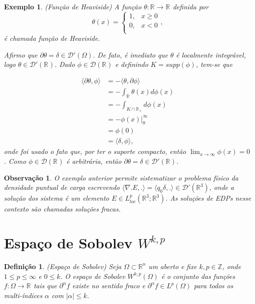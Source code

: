 \documentclass[12pt]{book}
\newtheorem{definicao}[teorema]{Definição}
\newtheorem{exemplo}[teorema]{Exemplo}
\newtheorem{observacao}[teorema]{Observação}
\newcommand{\distribuicoes}{\distribuicoesgeral{\Omega}}
\newcommand{\distribuicoesgeral}[1]{\mathcal{D'}(#1)}
\newcommand{\espacoLp}[1]{L^{p}(#1)}
\newcommand{\espacoLpcomp}[1]{L^{p}_{loc}(#1)}
\newcommand{\funcaocond}[5]{
	#1 = 
	\left\{
	\begin{array}{cc}
		#2, & #3\\
		#4, & #5\\
	\end{array}
	\right.
}
\newcommand{\funcoestestegeral}[1]{\mathcal{D}(#1)}
\newcommand{\inteiros}{\mathbb{Z}}
\newcommand{\produtointerno}[2]{\langle #1, #2 \rangle}
\newcommand{\real}[1]{\mathbb{R}^{#1}}
\newcommand{\reta}{\real{}}
\begin{document}
	\begin{exemplo}
		(Função de Heaviside) A função $\theta:\reta \to \reta$ definida por
		$$
		\funcaocond{\theta(x)}{1}{x\geq0}{0}{x<0},
		$$
		é chamada  função de Heaviside.
		
		Afirmo que $\partial\theta = \delta \in \distribuicoes$. De fato, é imediato que $\theta$ é localmente integrável, logo $\theta \in \distribuicoesgeral{\reta}$. Dado $\phi \in \funcoestestegeral{\reta}$ e definindo $K=supp(\phi)$, tem-se que 
		
		$$
		\begin{aligned}
		\produtointerno{\partial\theta}{\phi} 
		&= -\produtointerno{\theta}{\partial\phi} 
		\\
		&=-\int_{\reta}\theta(x)d\phi(x)
		\\
		&= -\int_{K\cap\reta_{+}}  d\phi(x) 
		\\
		&= -\phi(x)\Big|^{\infty}_{0} 
		\\
		&= \phi(0) 
		\\
		&= \produtointerno{\delta}{\phi},
		\end{aligned}
		$$
		onde foi usado o fato que, por ter o suporte compacto, então $\lim_{x\to \infty}\phi(x)=0$.
		Como $\phi \in \funcoestestegeral{\reta}$ é arbitrária, então $\partial \theta = \delta \in \distribuicoesgeral{\reta}$.
	\end{exemplo}
	
	\begin{observacao}
		O exemplo anterior permite sistematizar o problema físico da densidade puntual de carga escrevendo $\produtointerno{\nabla.E}{.} = \produtointerno{q_{0}\delta}{.} \in \distribuicoesgeral{\real{3}}$, onde a solução dos sistema é um elemento $E\in \espacoLpcomp{\real{3};\real{3}}$. As soluções de EDPs nesse contexto são chamadas soluções fracas.
	\end{observacao}

	\section{Espaço de Sobolev $W^{k,p}$}\label{secao_espaco_sobolev}
	
	\begin{definicao}\label{definicao_espaco_sobolev}
		(Espaço de Sobolev) Seja $\Omega \subset \real{n}$ um aberto e fixe $k, p\in \inteiros$, onde $1\leq p \leq \infty$ e $0\leq k$. O espaço de Sobolev $W^{k,p} (\Omega)$ é o conjunto das funções $f:\Omega\to \reta$ tais que $\partial^{\alpha}f$ existe no sentido fraco e $\partial^{\alpha}f \in \espacoLp{\Omega}$ para todos os multi-índices $\alpha$ com $|\alpha|\leq k$.
	\end{definicao}
	
\end{document}
